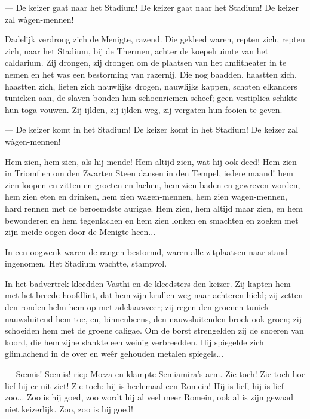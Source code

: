 \documentclass[a4paper, 12pt, oneside, dutch]{article}
\begin{document}
--- De keizer gaat naar het Stadium! De keizer gaat naar het Stadium! De keizer zal wàgen-mennen!

Dadelijk verdrong zich de Menigte, razend. Die gekleed waren, repten zich, repten zich, naar het Stadium, bij de Thermen, achter de koepelruimte van het caldarium. Zij drongen, zij drongen om de plaatsen van het amfitheater in te nemen en het was een bestorming van razernij. Die nog baadden, haastten zich, haastten zich, lieten zich nauwlijks drogen, nauwlijks kappen, schoten elkanders tunieken aan, de slaven bonden hun schoenriemen scheef; geen vestiplica schikte hun toga-vouwen. Zij ijlden, zij ijlden weg, zij vergaten hun fooien te geven.

--- De keizer komt in het Stadium! De keizer komt in het Stadium! De keizer zal wàgen-mennen!

Hem zien, hem zien, als hij mende! Hem altijd zien, wat hij ook deed! Hem zien in Triomf en om den Zwarten Steen dansen in den Tempel, iedere maand! hem zien loopen en zitten en groeten en lachen, hem zien baden en gewreven worden, hem zien eten en drinken, hem zien wagen-mennen, hem zien wagen-mennen, hard rennen met de beroemdste aurigae. Hem zien, hem altijd maar zien, en hem bewonderen en hem tegenlachen en hem zien lonken en smachten en zoeken met zijn meide-oogen door de Menigte heen...

In een oogwenk waren de rangen bestormd, waren alle zitplaatsen naar stand ingenomen. Het Stadium wachtte, stampvol.

In het badvertrek kleedden Vasthi en de kleedsters den keizer. Zij kapten hem met het breede hoofdlint, dat hem zijn krullen weg naar achteren hield; zij zetten den ronden helm hem op met adelaarsveer; zij regen den groenen tuniek nauwsluitend hem toe, en, binnenbeens, den nauwsluitenden broek ook groen; zij schoeiden hem met de groene caligae. Om de borst strengelden zij de snoeren van koord, die hem zijne slankte een weinig verbreedden. Hij spiegelde zich glimlachend in de over en weêr gehouden metalen spiegels...

--- Sœmis! Sœmis! riep Mœza en klampte Semiamira's arm. Zie toch! Zie toch hoe lief hij er uit ziet! Zie toch: hij is heelemaal een Romein! Hij is lief, hij is lief zoo... Zoo is hij goed, zoo wordt hij al veel meer Romein, ook al is zijn gewaad niet keizerlijk. Zoo, zoo is hij goed!
\end{document}
